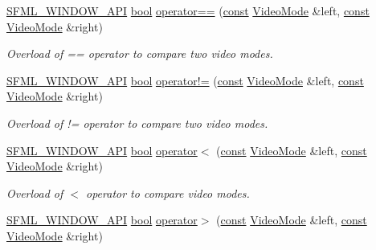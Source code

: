 \begin{DoxyCompactItemize}
\hyperlink{sfml_2dep_2_s_f_m_l-2_84_82_2include_2_s_f_m_l_2_window_2_export_8hpp_a1ab885b7907ee088350359516d68be64}{S\-F\-M\-L\-\_\-\-W\-I\-N\-D\-O\-W\-\_\-\-A\-P\-I} \hyperlink{term__entry_8h_a002004ba5d663f149f6c38064926abac}{bool} \hyperlink{classsf_1_1_video_mode_a03c51c119811ffd4403c6e2bcbd4ceaf}{operator==} (\hyperlink{term__entry_8h_a57bd63ce7f9a353488880e3de6692d5a}{const} \hyperlink{classsf_1_1_video_mode}{Video\-Mode} \&left, \hyperlink{term__entry_8h_a57bd63ce7f9a353488880e3de6692d5a}{const} \hyperlink{classsf_1_1_video_mode}{Video\-Mode} \&right)
\begin{DoxyCompactList}\small\item\em Overload of == operator to compare two video modes. \end{DoxyCompactList}\item 
\hyperlink{sfml_2dep_2_s_f_m_l-2_84_82_2include_2_s_f_m_l_2_window_2_export_8hpp_a1ab885b7907ee088350359516d68be64}{S\-F\-M\-L\-\_\-\-W\-I\-N\-D\-O\-W\-\_\-\-A\-P\-I} \hyperlink{term__entry_8h_a002004ba5d663f149f6c38064926abac}{bool} \hyperlink{classsf_1_1_video_mode_abd7bf172d318085ea572b8c10033f7b7}{operator!=} (\hyperlink{term__entry_8h_a57bd63ce7f9a353488880e3de6692d5a}{const} \hyperlink{classsf_1_1_video_mode}{Video\-Mode} \&left, \hyperlink{term__entry_8h_a57bd63ce7f9a353488880e3de6692d5a}{const} \hyperlink{classsf_1_1_video_mode}{Video\-Mode} \&right)
\begin{DoxyCompactList}\small\item\em Overload of != operator to compare two video modes. \end{DoxyCompactList}\item 
\hyperlink{sfml_2dep_2_s_f_m_l-2_84_82_2include_2_s_f_m_l_2_window_2_export_8hpp_a1ab885b7907ee088350359516d68be64}{S\-F\-M\-L\-\_\-\-W\-I\-N\-D\-O\-W\-\_\-\-A\-P\-I} \hyperlink{term__entry_8h_a002004ba5d663f149f6c38064926abac}{bool} \hyperlink{classsf_1_1_video_mode_a8e3d8fa57fa10dca05edbc34c4e2f1a8}{operator$<$} (\hyperlink{term__entry_8h_a57bd63ce7f9a353488880e3de6692d5a}{const} \hyperlink{classsf_1_1_video_mode}{Video\-Mode} \&left, \hyperlink{term__entry_8h_a57bd63ce7f9a353488880e3de6692d5a}{const} \hyperlink{classsf_1_1_video_mode}{Video\-Mode} \&right)
\begin{DoxyCompactList}\small\item\em Overload of $<$ operator to compare video modes. \end{DoxyCompactList}\item 
\hyperlink{sfml_2dep_2_s_f_m_l-2_84_82_2include_2_s_f_m_l_2_window_2_export_8hpp_a1ab885b7907ee088350359516d68be64}{S\-F\-M\-L\-\_\-\-W\-I\-N\-D\-O\-W\-\_\-\-A\-P\-I} \hyperlink{term__entry_8h_a002004ba5d663f149f6c38064926abac}{bool} \hyperlink{classsf_1_1_video_mode_ab6e5b2c65a428a4b56de8551b3706a36}{operator$>$} (\hyperlink{term__entry_8h_a57bd63ce7f9a353488880e3de6692d5a}{const} \hyperlink{classsf_1_1_video_mode}{Video\-Mode} \&left, \hyperlink{term__entry_8h_a57bd63ce7f9a353488880e3de6692d5a}{const} \hyperlink{classsf_1_1_video_mode}{Video\-Mode} \&right)

\end{DoxyCompactItemize}
